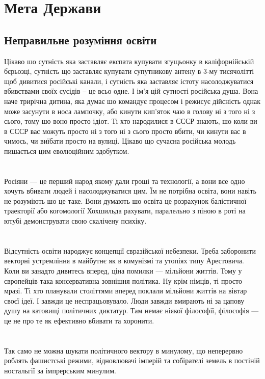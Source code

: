 
\section{Мета Держави}

\subsection{Неправильне розуміння освіти}

Цікаво шо сутність яка заставляє експата купувати згущьонку в каліфорнійській бєрьозці, сутність що заставляє купувати супутникову антену в 3-му тисячолітті щоб дивитися російські канали, і сутність яка заставляє істоту насолоджуватися вбивствами своїх сусідів -- це всьо одне. І ім'я цій сутності російська душа. Вона наче трирічна дитина, яка думає шо командує процесом і режисує дійсність однак може засунути в носа лампочку, або кинути кип'яток чаю в голову ні з того ні з сього, тому шо воно просто ідіот. Ті хто народилися в СССР знають, шо коли ви в СССР вас можуть просто ні з того ні з сього просто вбити, чи кинути вас в чимось, чи виїбати просто на вулиці. Цікаво що сучасна російська молодь пишається цим еволюційним здобутком.\\
\\
\\
Росіяни — це перший народ якому дали гроші та технології, а вони все одно хочуть вбивати людей і насолоджуватися цим. Їм не потрібна освіта, вони навіть не розуміють шо це таке. Вони думають шо освіта це розрахунок балістичної траекторії або когомології Хохшильда рахувати, паралельно з піною в роті на ютубі демонструвати свою скалічену психіку.\\
\\
\\
Відсутність освіти народжує концепції євразійської небезпеки. Треба заборонити векторні устремління в майбутнє як в комунізмі та утопіях типу Арестовича. Коли ви занадто дивитесь вперед, ціна помилки — мільйони життів. Тому у європейців така консервативна зовнішня політика. Ну крім німців, ті просто мразі. Ті хто планували століттями вперед поклали мільйони життів на вівтар своєї ідеї. І завжди це неспрацьовувало. Люди завжди вмирають ні за цапову душу на катовищі політичних диктатур. Там немає ніякої філософії, філософія — це не про те як ефективно вбивати та хоронити.\\
\\
\\
Так само не можна шукати політичного вектору в минулому, що неперервно роблять фашистські режими, відновлювачі імперій та собіратєлі земель в постіній ностальгії за імпрерським минулим.\\
